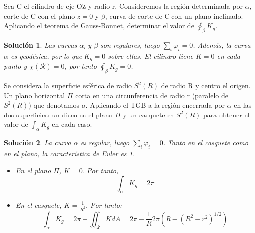 \documentclass[twoside]{report}
\theoremstyle{plain}
\newtheorem*{sol*}{Solución}
\newenvironment{ejercicio}[2][Estado]{\begin{trivlist}
\item[\hskip \labelsep {\bfseries Ejercicio}\hskip \labelsep {\bfseries #2.}]}{\end{trivlist}}
\begin{document}
\newpage
\begin{ejercicio}{13} Sea C el cilindro de eje OZ y radio r. Consideremos la región determinada por $\alpha$, corte de C con el plano $z=0$ y $\beta$, curva de corte de C con un plano inclinado. Aplicando el teorema de Gauss-Bonnet, determinar el valor de $\oint_\beta K_g$.
\end{ejercicio}
\begin{sol*}
Las curvas $\alpha_i$ y $\beta$ son regulares, luego $\sum_i \varphi_i =0$. Además, la curva $\alpha$ es geodésica, por lo que $K_g=0$ sobre ellas. El cilindro tiene $K=0$ en cada punto y $\chi(\mathcal{R})=0$, por tanto $\oint_\beta K_g = 0$.
\end{sol*}
\newpage
\begin{ejercicio}{14} Se considera la superficie esférica de radio $S^2(R)$ de radio R y centro el origen. Un plano horizontal $\Pi$ corta en una circunferencia de radio r (paralelo de $S^2(R)$) que denotamos $\alpha$. Aplicando el TGB a la región encerrada por $\alpha$ en las dos superficies: un disco en el plano $\Pi$ y un casquete en $S^2(R)$ para obtener el valor de $\int_\alpha K_g$ en cada caso.
\end{ejercicio}
\begin{sol*}
La curva $\alpha$ es regular, luego $\sum_i \varphi_i =0$. Tanto en el casquete como en el plano, la característica de Euler es 1. 
\begin{itemize}
\item En el plano $\Pi$, $K=0$. Por tanto, 
\[
\int_\alpha K_g = 2\pi
\]
\item En el casquete, $K=\frac{1}{R^2}$. Por tanto:
\[
\int_\alpha K_g = 2\pi - \iint_{\mathcal{R}}K dA = 2\pi - \frac{1}{R} 2\pi(R - (R^2-r^2)^{1/2})
\]
\end{itemize}
\end{sol*}
\end{document}
